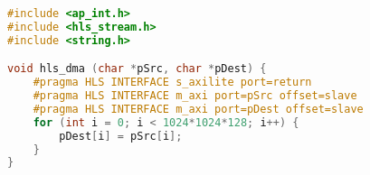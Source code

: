 \singlespacing
\begin{lstlisting}[language=C++, caption= Memory Copier Block HLS, label={lst:MCB}]
#include <ap_int.h>
#include <hls_stream.h>
#include <string.h>

void hls_dma (char *pSrc, char *pDest) {
    #pragma HLS INTERFACE s_axilite port=return
    #pragma HLS INTERFACE m_axi port=pSrc offset=slave
    #pragma HLS INTERFACE m_axi port=pDest offset=slave
    for (int i = 0; i < 1024*1024*128; i++) {
        pDest[i] = pSrc[i];
    }
}
\end{lstlisting}
\doublespacing
